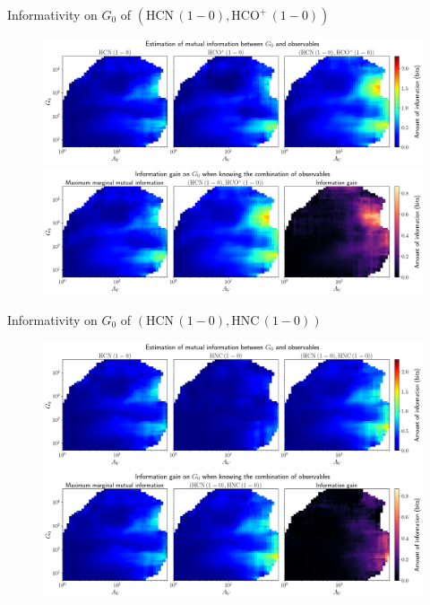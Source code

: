 \documentclass{beamer}
\begin{document}
\begin{frame}{Informativity on $G_0$ of $\left(\mathrm{HCN\,(1-0)},\mathrm{HCO^+\,(1-0)}\right)$}
    \begin{figure}
        \centering
        \includegraphics[width=0.95\linewidth]{../mi/g0__hcn10_hcop10_mi.png}
        \vfill
        \includegraphics[width=0.95\linewidth]{../mi/g0__hcn10_hcop10_mi_gain.png}
    \end{figure}
\end{frame}

\begin{frame}{Informativity on $G_0$ of $\left(\mathrm{HCN\,(1-0)},\mathrm{HNC\,(1-0)}\right)$}
    \begin{figure}
        \centering
        \includegraphics[width=0.95\linewidth]{../mi/g0__hcn10_hnc10_mi.png}
        \vfill
        \includegraphics[width=0.95\linewidth]{../mi/g0__hcn10_hnc10_mi_gain.png}
    \end{figure}
\end{frame}
\end{document}
